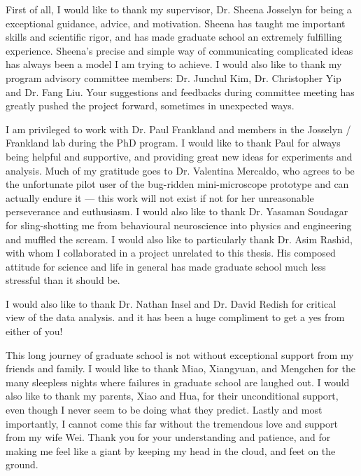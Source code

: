 First of all, I would like to thank my supervisor, Dr. Sheena Josselyn for being a exceptional guidance, advice, and motivation. Sheena has taught me important skills and scientific rigor, and has made graduate school an extremely fulfilling experience. Sheena's precise and simple way of communicating complicated ideas has always been a model I am trying to achieve. I would also like to thank my program advisory committee members: Dr. Junchul Kim, Dr. Christopher Yip and Dr. Fang Liu. Your suggestions and feedbacks during committee meeting has greatly pushed the project forward, sometimes in unexpected ways. 

I am privileged to work with Dr. Paul Frankland and members in the Josselyn / Frankland lab during the PhD program. I would like to thank Paul for always being helpful and supportive, and providing great new ideas for experiments and analysis. Much of my gratitude goes to Dr. Valentina Mercaldo, who agrees to be the unfortunate pilot user of the bug-ridden mini-microscope prototype and can actually endure it --- this work will not exist if not for her unreasonable perseverance and euthusiasm. I would also like to thank Dr. Yasaman Soudagar for sling-shotting me from behavioural neuroscience into physics and engineering and muffled the scream. I would also like to particularly thank Dr. Asim Rashid, with whom I collaborated in a project unrelated to this thesis. His composed attitude for science and life in general has made graduate school much less stressful than it should be. 

I would also like to thank Dr. Nathan Insel and Dr. David Redish for critical view of the data analysis. and it has been a huge compliment to get a yes from either of you! 

This long journey of graduate school is not without exceptional support from my friends and family.  I would like to thank Miao, Xiangyuan, and Mengchen for the many sleepless nights where failures in graduate school are laughed out. I would also like to thank my parents, Xiao and Hua, for their unconditional support, even though I never seem to be doing what they predict. Lastly and most importantly, I cannot come this far without the tremendous love and support from my wife Wei. Thank you for your understanding and patience, and for making me feel like a giant by keeping my head in the cloud, and feet on the ground. 


